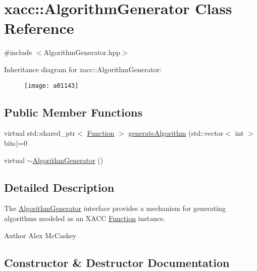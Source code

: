 \hypertarget{a01143}{}\section{xacc\+:\+:Algorithm\+Generator Class Reference}
\label{a01143}


{\ttfamily \#include $<$Algorithm\+Generator.\+hpp$>$}

Inheritance diagram for xacc\+:\+:Algorithm\+Generator\+:\begin{figure}[H]
\begin{center}
\leavevmode
\texttt{[image: a01143]}
\end{center}
\end{figure}
\subsection*{Public Member Functions}
\begin{DoxyCompactItemize}
\item 
virtual std\+::shared\+\_\+ptr$<$ \hyperlink{a01151}{Function} $>$ \hyperlink{a01143_a73023c06f0f0c62ad56ab4187b18b096}{generate\+Algorithm} (std\+::vector$<$ int $>$ bits)=0
\item 
virtual \hyperlink{a01143_a096f66aa8d65f5aa3276915768159579}{$\sim$\+Algorithm\+Generator} ()
\end{DoxyCompactItemize}


\subsection{Detailed Description}
The \hyperlink{a01143}{Algorithm\+Generator} interface provides a mechanism for generating algorithms modeled as an X\+A\+CC \hyperlink{a01151}{Function} instance.

\begin{DoxyAuthor}{Author}
Alex Mc\+Caskey 
\end{DoxyAuthor}


\subsection{Constructor \& Destructor Documentation}
\mbox{\label{a01143_a096f66aa8d65f5aa3276915768159579}} 
